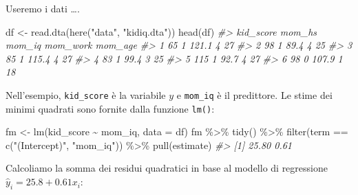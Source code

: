 \documentclass[
  10pt,
  italian,
  a4paper,
  extrafontsizes,onecolumn,openright
  ]{memoir}
\newenvironment{Shaded}{\begin{snugshade}}{\end{snugshade}}
\newcommand{\AttributeTok}[1]{\textcolor[rgb]{0.77,0.63,0.00}{#1}}
\newcommand{\CommentTok}[1]{\textcolor[rgb]{0.56,0.35,0.01}{\textit{#1}}}
\newcommand{\FloatTok}[1]{\textcolor[rgb]{0.00,0.00,0.81}{#1}}
\newcommand{\FunctionTok}[1]{\textcolor[rgb]{0.00,0.00,0.00}{#1}}
\newcommand{\NormalTok}[1]{#1}
\newcommand{\OtherTok}[1]{\textcolor[rgb]{0.56,0.35,0.01}{#1}}
\newcommand{\SpecialCharTok}[1]{\textcolor[rgb]{0.00,0.00,0.00}{#1}}
\newcommand{\StringTok}[1]{\textcolor[rgb]{0.31,0.60,0.02}{#1}}
\begin{document}
Useremo i dati \ldots.

\begin{Shaded}
\begin{Highlighting}[]
\NormalTok{df }\OtherTok{\textless{}{-}} \FunctionTok{read.dta}\NormalTok{(}\FunctionTok{here}\NormalTok{(}\StringTok{"data"}\NormalTok{, }\StringTok{"kidiq.dta"}\NormalTok{))}
\FunctionTok{head}\NormalTok{(df)}
\CommentTok{\#\textgreater{}   kid\_score mom\_hs mom\_iq mom\_work mom\_age}
\CommentTok{\#\textgreater{} 1        65      1  121.1        4      27}
\CommentTok{\#\textgreater{} 2        98      1   89.4        4      25}
\CommentTok{\#\textgreater{} 3        85      1  115.4        4      27}
\CommentTok{\#\textgreater{} 4        83      1   99.4        3      25}
\CommentTok{\#\textgreater{} 5       115      1   92.7        4      27}
\CommentTok{\#\textgreater{} 6        98      0  107.9        1      18}
\end{Highlighting}
\end{Shaded}

Nell'esempio, \texttt{kid\_score} è la variabile \(y\) e \texttt{mom\_iq} è il predittore. Le stime dei minimi quadrati sono fornite dalla funzione \texttt{lm()}:

\begin{Shaded}
\begin{Highlighting}[]
\NormalTok{fm }\OtherTok{\textless{}{-}} \FunctionTok{lm}\NormalTok{(kid\_score }\SpecialCharTok{\textasciitilde{}}\NormalTok{ mom\_iq, }\AttributeTok{data =}\NormalTok{ df)}
\NormalTok{fm }\SpecialCharTok{\%\textgreater{}\%}
  \FunctionTok{tidy}\NormalTok{() }\SpecialCharTok{\%\textgreater{}\%} 
  \FunctionTok{filter}\NormalTok{(term }\SpecialCharTok{==} \FunctionTok{c}\NormalTok{(}\StringTok{"(Intercept)"}\NormalTok{, }\StringTok{"mom\_iq"}\NormalTok{)) }\SpecialCharTok{\%\textgreater{}\%} 
  \FunctionTok{pull}\NormalTok{(estimate)}
\CommentTok{\#\textgreater{} [1] 25.80  0.61}
\end{Highlighting}
\end{Shaded}

Calcoliamo la somma dei residui quadratici in base al modello di regressione \(\hat{y}_i = 25.8 + 0.61 x_i\):

\begin{Shaded}
\end{Shaded}
\end{document}
